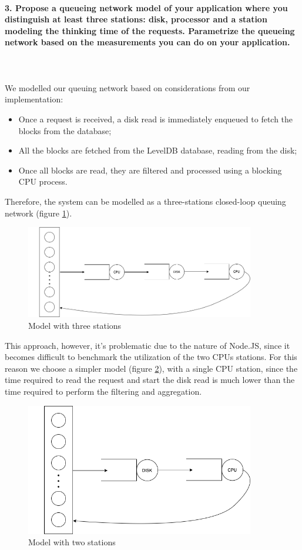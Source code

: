 \documentclass[11pt]{scrartcl} %
\begin{document}
\paragraph*{3. Propose a queueing network model of your application where you distinguish at least three stations: disk, processor and a station modeling the thinking time of the requests. Parametrize the queueing network based on the measurements you can do on your application.} \mbox{}\\\\

We modelled our queuing network based on considerations from our implementation:

\begin{itemize}
\item[\adforn{43}] Once a request is received, a disk read is immediately enqueued to fetch the blocks from the database;
\item[\adforn{43}] All the blocks are fetched from the LevelDB database, reading from the disk;
\item[\adforn{43}] Once all blocks are read, they are filtered and processed using a blocking CPU process.
\end{itemize}

Therefore, the system can be modelled as a three-stations closed-loop queuing network (figure \ref{fig:img1}).

\begin{figure}[h]
\includegraphics[width=10cm]{Images/img1.png}
\centering
\caption{Model with three stations}
\label{fig:img1}
\end{figure}

This approach, however, it's problematic due to the nature of Node.JS, since it becomes difficult to benchmark the utilization of the two CPUs stations. For this reason we choose a simpler model (figure \ref{fig:img2}), with a single CPU station, since the time required to read the request and start the disk read is much lower than the time required to perform the filtering and aggregation.

\begin{figure}[h]
\includegraphics[width=10cm]{Images/img2.png}
\centering
\caption{Model with two stations}
\label{fig:img2}
\end{figure}
\end{document}
